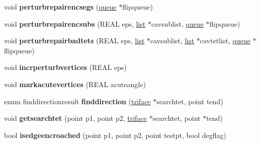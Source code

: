 \begin{DoxyCompactItemize}
void {\bfseries perturbrepairencsegs} (\hyperlink{classStemMesh3D_1_1tetgenmesh_1_1queue}{queue} $\ast$flipqueue)
\item 
\mbox{\label{classStemMesh3D_1_1tetgenmesh_a5b220e6105d72e2b3c45db975706776b}} 
void {\bfseries perturbrepairencsubs} (R\+E\+AL eps, \hyperlink{classStemMesh3D_1_1tetgenmesh_1_1list}{list} $\ast$cavsublist, \hyperlink{classStemMesh3D_1_1tetgenmesh_1_1queue}{queue} $\ast$flipqueue)
\item 
\mbox{\label{classStemMesh3D_1_1tetgenmesh_ae4f00263a824eb3a1165808ecec86172}} 
void {\bfseries perturbrepairbadtets} (R\+E\+AL eps, \hyperlink{classStemMesh3D_1_1tetgenmesh_1_1list}{list} $\ast$cavsublist, \hyperlink{classStemMesh3D_1_1tetgenmesh_1_1list}{list} $\ast$cavtetlist, \hyperlink{classStemMesh3D_1_1tetgenmesh_1_1queue}{queue} $\ast$flipqueue)
\item 
\mbox{\label{classStemMesh3D_1_1tetgenmesh_a17a4ede27771eecf61966ac60cfc3c45}} 
void {\bfseries incrperturbvertices} (R\+E\+AL eps)
\item 
\mbox{\label{classStemMesh3D_1_1tetgenmesh_a99a28822956ce0624d3468caa0b89110}} 
void {\bfseries markacutevertices} (R\+E\+AL acuteangle)
\item 
\mbox{\label{classStemMesh3D_1_1tetgenmesh_ad61ef985386d7e6aa3da96edd9714ecf}} 
enum finddirectionresult {\bfseries finddirection} (\hyperlink{classStemMesh3D_1_1tetgenmesh_1_1triface}{triface} $\ast$searchtet, point tend)
\item 
\mbox{\label{classStemMesh3D_1_1tetgenmesh_ab0e75c0242a092b1edc1799c88ab565b}} 
void {\bfseries getsearchtet} (point p1, point p2, \hyperlink{classStemMesh3D_1_1tetgenmesh_1_1triface}{triface} $\ast$searchtet, point $\ast$tend)
\item 
\mbox{\label{classStemMesh3D_1_1tetgenmesh_ab9d3eb78a812f192f579e415a450c122}} 
bool {\bfseries isedgeencroached} (point p1, point p2, point testpt, bool degflag)
\item 
\mbox{\label{classStemMesh3D_1_1tetgenmesh_acd158f7bf7c3b8944ea3ce29064d9a62}} 

\end{DoxyCompactItemize}
